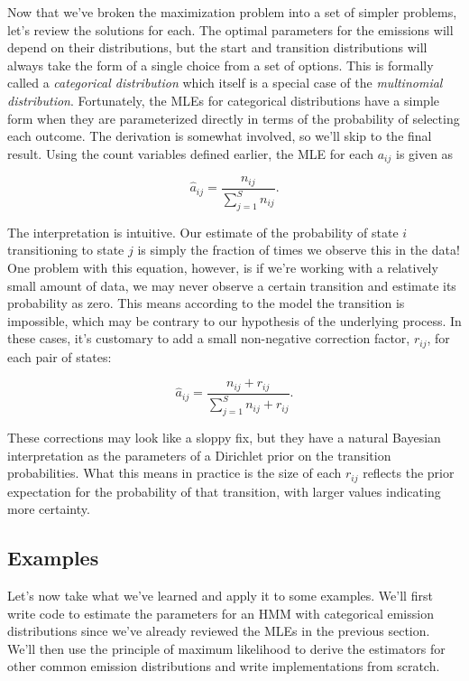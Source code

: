 Now that we've broken the maximization problem into a set of simpler problems, let's review the solutions for each. The optimal parameters for the emissions will depend on their distributions, but the start and transition distributions will always take the form of a single choice from a set of options. This is formally called a \textit{categorical distribution} which itself is a special case of the \textit{multinomial distribution}. Fortunately, the MLEs for categorical distributions have a simple form when they are parameterized directly in terms of the probability of selecting each outcome. The derivation is somewhat involved, so we'll skip to the final result. Using the count variables defined earlier, the MLE for each $a_{ij}$ is given as

\begin{equation*}
\hat{a}_{ij} = \frac{n_{ij}}{\sum_{j=1}^S n_{ij}}.
\end{equation*}

The interpretation is intuitive. Our estimate of the probability of state $i$ transitioning to state $j$ is simply the fraction of times we observe this in the data! One problem with this equation, however, is if we're working with a relatively small amount of data, we may never observe a certain transition and estimate its probability as zero. This means according to the model the transition is impossible, which may be contrary to our hypothesis of the underlying process. In these cases, it's customary to add a small non-negative correction factor, $r_{ij}$, for each pair of states:

\begin{equation*}
\hat{a}_{ij} = \frac{n_{ij} + r_{ij}}{\sum_{j=1}^S n_{ij} + r_{ij}}.
\end{equation*}

These corrections may look like a sloppy fix, but they have a natural Bayesian interpretation as the parameters of a Dirichlet prior on the transition probabilities. What this means in practice is the size of each $r_{ij}$ reflects the prior expectation for the probability of that transition, with larger values indicating more certainty.

\subsection{Examples}

Let's now take what we've learned and apply it to some examples. We'll first write code to estimate the parameters for an HMM with categorical emission distributions since we've already reviewed the MLEs in the previous section. We'll then use the principle of maximum likelihood to derive the estimators for other common emission distributions and write implementations from scratch.

